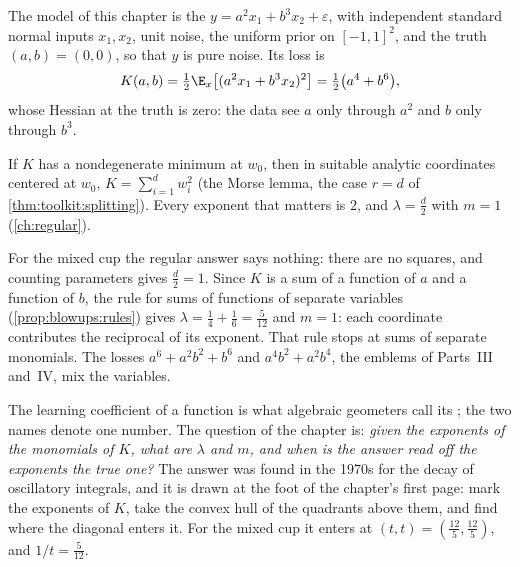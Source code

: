 \begin{refsection}
The model of this chapter is the  $y=a^2x_1+b^3x_2+\varepsilon$, with independent standard normal inputs $x_1,x_2$, unit noise, the uniform prior on $[-1,1]^2$, and the truth $(a,b)=(0,0)$, so that $y$ is pure noise. Its loss is
\[
K(a,b)=\tfrac12\E_x\bigl[(a^2x_1+b^3x_2)^2\bigr]=\tfrac12\bigl(a^4+b^6\bigr),
\]
whose Hessian at the truth is zero: the data see $a$ only through $a^2$ and $b$ only through $b^3$.

\begin{regularanswer}[exponents]
If $K$ has a nondegenerate minimum at $w_0$, then in suitable analytic coordinates centered at $w_0$, $K=\sum_{i=1}^dw_i^2$ (the Morse lemma, the case $r=d$ of \cref{thm:toolkit:splitting}). Every exponent that matters is $2$, and $\lambda=\frac d2$ with $m=1$ (\cref{ch:regular}).
\end{regularanswer}

For the mixed cup the regular answer says nothing: there are no squares, and counting parameters gives $\frac d2=1$. Since $K$ is a sum of a function of $a$ and a function of $b$, the rule for sums of functions of separate variables (\cref{prop:blowups:rules}) gives $\lambda=\frac14+\frac16=\frac5{12}$ and $m=1$: each coordinate contributes the reciprocal of its exponent. That rule stops at sums of separate monomials. The losses $a^6+a^2b^2+b^6$ and $a^4b^2+a^2b^4$, the emblems of Parts~III and~IV, mix the variables.

The learning coefficient of a function is what algebraic geometers call its ; the two names denote one number. The question of the chapter is: \emph{given the exponents of the monomials of $K$, what are $\lambda$ and $m$, and when is the answer read off the exponents the true one?} The answer was found in the 1970s for the decay of oscillatory integrals, and it is drawn at the foot of the chapter's first page: mark the exponents of $K$, take the convex hull of the quadrants above them, and find where the diagonal enters it. For the mixed cup it enters at $(t,t)=(\frac{12}5,\frac{12}5)$, and $1/t=\frac5{12}$.


\end{refsection}
